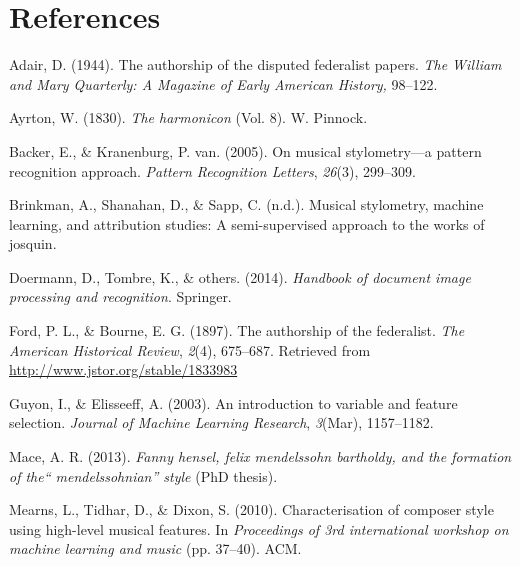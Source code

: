 \documentclass[12pt,twoside]{reedthesis}
\theoremstyle{definition}
\theoremstyle{definition}
\theoremstyle{definition}
\theoremstyle{remark}
\begin{document}
\backmatter

\chapter*{References}\label{references}


\noindent

\setlength{\parindent}{-0.20in} \setlength{\leftskip}{0.20in}
\setlength{\parskip}{8pt}

\hypertarget{refs}{}
\hypertarget{ref-adair1944}{}
Adair, D. (1944). The authorship of the disputed federalist papers.
\emph{The William and Mary Quarterly: A Magazine of Early American
History,} 98--122.

\hypertarget{ref-harmonicon}{}
Ayrton, W. (1830). \emph{The harmonicon} (Vol. 8). W. Pinnock.

\hypertarget{ref-backer2005}{}
Backer, E., \& Kranenburg, P. van. (2005). On musical stylometry---a
pattern recognition approach. \emph{Pattern Recognition Letters},
\emph{26}(3), 299--309.

\hypertarget{ref-brinkman2016}{}
Brinkman, A., Shanahan, D., \& Sapp, C. (n.d.). Musical stylometry,
machine learning, and attribution studies: A semi-supervised approach to
the works of josquin.

\hypertarget{ref-OMR}{}
Doermann, D., Tombre, K., \& others. (2014). \emph{Handbook of document
image processing and recognition}. Springer.

\hypertarget{ref-authorshipfed}{}
Ford, P. L., \& Bourne, E. G. (1897). The authorship of the federalist.
\emph{The American Historical Review}, \emph{2}(4), 675--687. Retrieved
from \url{http://www.jstor.org/stable/1833983}

\hypertarget{ref-guyon2003}{}
Guyon, I., \& Elisseeff, A. (2003). An introduction to variable and
feature selection. \emph{Journal of Machine Learning Research},
\emph{3}(Mar), 1157--1182.

\hypertarget{ref-mace2013}{}
Mace, A. R. (2013). \emph{Fanny hensel, felix mendelssohn bartholdy, and
the formation of the`` mendelssohnian'' style} (PhD thesis).

\hypertarget{ref-mearns2010}{}
Mearns, L., Tidhar, D., \& Dixon, S. (2010). Characterisation of
composer style using high-level musical features. In \emph{Proceedings
of 3rd international workshop on machine learning and music} (pp.
37--40). ACM.
\end{document}
